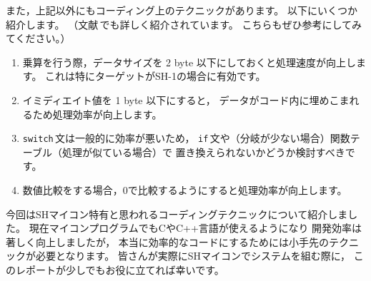 \documentclass[a4j,10pt,fleqn]{jsarticle}
\begin{document}
また，上記以外にもコーディング上のテクニックがあります。
以下にいくつか紹介します。
（文献\cite{SH:MANUAL:CCompiler}\,でも詳しく紹介されています。
こちらもぜひ参考にしてみてください。）

\begin{enumerate}
\item 乗算を行う際，データサイズを 2 byte 以下にしておくと処理速度が向上します。
    これは特にターゲットがSH-1の場合に有効です。
\item イミディエイト値を 1 byte 以下にすると，
    データがコード内に埋めこまれるため処理効率が向上します。
\item \texttt{switch}\,文は一般的に効率が悪いため，
    \texttt{if}\,文や（分岐が少ない場合）関数テーブル（処理が似ている場合）で
    置き換えられないかどうか検討すべきです。
\item 数値比較をする場合，0で比較するようにすると処理効率が向上します。
\end{enumerate}

今回はSHマイコン特有と思われるコーディングテクニックについて紹介しました。
現在マイコンプログラムでもCやC++言語が使えるようになり
開発効率は著しく向上しましたが，
本当に効率的なコードにするためには小手先のテクニックが必要となります。
皆さんが実際にSHマイコンでシステムを組む際に，
このレポートが少しでもお役に立てれば幸いです。


\clearpage


\end{document}
